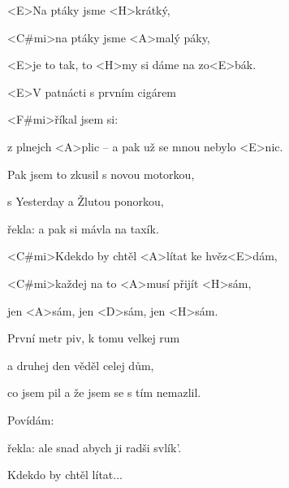 

\zr
<E>Na ptáky jsme <H>krátký,

<C#mi>na ptáky jsme <A>malý páky,

<E>je to tak, to <H>my si dáme na zo<E>bák.
\kr

\zs
<E>V patnácti s prvním cigárem

<F#mi>říkal jsem si: 

z plnejch <A>plic -- a pak už se mnou nebylo <E>nic.
\ks

\zs
Pak jsem to zkusil s novou motorkou,

s Yesterday a Žlutou ponorkou,

řekla:  a pak si mávla na taxík.
\ks

\zs
<C#mi>Kdekdo by chtěl <A>lítat ke hvěz<E>dám,

<C#mi>každej na to <A>musí přijít <H>sám,

jen <A>sám, jen <D>sám, jen <H>sám.
\ks

\zr
\kr

\zs
První metr piv, k tomu velkej rum

a druhej den věděl celej dům,

co jsem pil a že jsem se s tím nemazlil.
\ks

\zs
Povídám: 

řekla:  ale snad abych ji radši svlík'.
\ks

\zs
Kdekdo by chtěl lítat...
\ks

\zr
\kr

\zr
\kr

\kp
